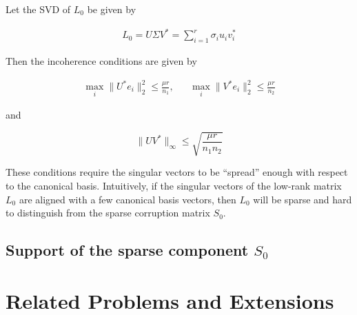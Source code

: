 \documentclass{../common/projectreport}
\begin{document}
Let the SVD of $L_0$ be given by

\begin{align}
L_0 = U\Sigma V^* = \sum_{i=1}^r \sigma_i u_i v_i^*
\end{align}

Then the incoherence conditions are given by

\begin{equation}
\begin{aligned}
\max_i \|U^*e_i\|_2^2 \leq \frac{\mu r}{n_1}, && \max_i \|V^*e_i\|_2^2 \leq \frac{\mu r}{n_2}
\label{incoherence1}
\end{aligned}
\end{equation}

and

\begin{equation}
\| U V^* \|_\infty \leq \sqrt{\frac{\mu r}{n_1 n_2}} \label{incoherence2}
\end{equation}

These conditions require the singular vectors to be ``spread'' enough with respect to the canonical basis. Intuitively, if the singular vectors of the low-rank matrix $L_0$ are aligned with a few canonical basis vectors, then $L_0$ will be sparse and hard to distinguish from the sparse corruption matrix $S_0$.


\subsection{Support of the sparse component $S_0$}







\newpage
\section{Related Problems and Extensions}


\end{document}

